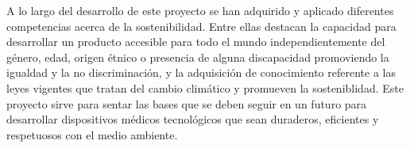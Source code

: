 A lo largo del desarrollo de este proyecto se han adquirido y aplicado diferentes competencias acerca de la sostenibilidad. Entre ellas destacan la capacidad para desarrollar un producto accesible para todo el mundo independientemente del género, edad, origen étnico o presencia de alguna discapacidad promoviendo la igualdad y la no discriminación, y la adquisición de conocimiento referente a las leyes vigentes que tratan del cambio climático y promueven la sosteniblidad. Este proyecto sirve para sentar las bases que se deben seguir en un futuro para desarrollar dispositivos médicos tecnológicos que sean duraderos, eficientes y respetuosos con el medio ambiente.